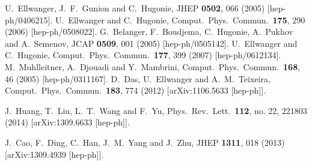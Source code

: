 \documentclass[preprintnumbers,superscriptaddress,nofootinbib,aps,prd,floatfix]{revtex4}
\begin{document}
\begin{thebibliography}{99}
  U.~Ellwanger, J.~F.~Gunion and C.~Hugonie,
  JHEP {\bf 0502}, 066 (2005)
  [hep-ph/0406215].
  U.~Ellwanger and C.~Hugonie,
  Comput.\ Phys.\ Commun.\  {\bf 175}, 290 (2006)
  [hep-ph/0508022].
  G.~Belanger, F.~Boudjema, C.~Hugonie, A.~Pukhov and A.~Semenov,
  JCAP {\bf 0509}, 001 (2005)
  [hep-ph/0505142].
  U.~Ellwanger and C.~Hugonie,
  Comput.\ Phys.\ Commun.\  {\bf 177}, 399 (2007)
  [hep-ph/0612134].
  M.~Muhlleitner, A.~Djouadi and Y.~Mambrini,
  Comput.\ Phys.\ Commun.\  {\bf 168}, 46 (2005)
  [hep-ph/0311167].
  D.~Das, U.~Ellwanger and A.~M.~Teixeira,
  Comput.\ Phys.\ Commun.\  {\bf 183}, 774 (2012)
  [arXiv:1106.5633 [hep-ph]].

  J.~Huang, T.~Liu, L.~T.~Wang and F.~Yu,
  Phys.\ Rev.\ Lett.\  {\bf 112}, no. 22, 221803 (2014)
  [arXiv:1309.6633 [hep-ph]].
  
  J.~Cao, F.~Ding, C.~Han, J.~M.~Yang and J.~Zhu,
  JHEP {\bf 1311}, 018 (2013)
  [arXiv:1309.4939 [hep-ph]].

\end{thebibliography}
\end{document}
